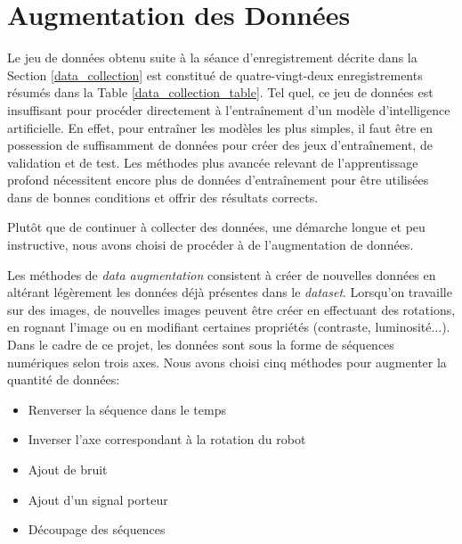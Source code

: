 \section{Augmentation des Données}
Le jeu de données obtenu suite à la séance d'enregistrement décrite dans la Section \ref{data_collection} est constitué de quatre-vingt-deux enregistrements résumés dans la Table \ref{data_collection_table}. Tel quel, ce jeu de données est insuffisant pour procéder directement à l'entraînement d'un modèle d'intelligence artificielle. En effet, pour entraîner les modèles les plus simples, il faut être en possession de suffisamment de données pour créer des jeux d'entraînement, de validation et de test. Les méthodes plus avancée relevant de l'apprentissage profond nécessitent encore plus de données d'entraînement pour être utilisées dans de bonnes conditions et offrir des résultats corrects.

Plutôt que de continuer à collecter des données, une démarche longue et peu instructive, nous avons choisi de procéder à de l'augmentation de données.

Les méthodes de \textit{data augmentation} consistent à créer de nouvelles données en altérant légèrement les données déjà présentes dans le \textit{dataset}. Lorsqu'on travaille sur des images, de nouvelles images peuvent être créer en effectuant des rotations, en rognant l'image ou en modifiant certaines propriétés (contraste, luminosité...).\\
Dans le cadre de ce projet, les données sont sous la forme de séquences numériques selon trois axes. Nous avons choisi cinq méthodes pour augmenter la quantité de données:
\begin{itemize}
    \item Renverser la séquence dans le temps
    \item Inverser l'axe correspondant à la rotation du robot
    \item Ajout de bruit
    \item Ajout d'un signal porteur
    \item Découpage des séquences
\end{itemize}

